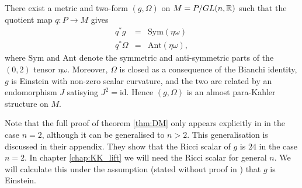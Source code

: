 \begin{theo}{\cite{DM}}\label{thm:DM}
There exist a metric and two-form
$(g,\Omega)$ on $\mbox{\ensuremath{M=P/GL(n,\mathbb{R})}}$ such
that the quotient map $q:P\rightarrow M$ gives
\begin{eqnarray} 
q^{*}g & = & \mathrm{Sym}(\eta\omega) \label{eq:g_cartan} \\
q^{*}\Omega & = & \mathrm{Ant}(\eta\omega), \label{eq:Omega_cartan}
\end{eqnarray}
where $\mathrm{Sym}$ and $\mathrm{Ant}$ denote the symmetric and
anti-symmetric parts of the $(0,2)$ tensor $\eta\omega$. Moreover,
$\Omega$ is closed as a consequence of the Bianchi identity, $g$
is Einstein with non-zero scalar curvature, and the two are related
by an endomorphism $J$ satisying $J^{2}=\mathrm{id}$. Hence $(g,\Omega)$
is an almost para-Kahler structure on $M$.
\end{theo}

Note that the full proof of theorem \ref{thm:DM} only appears explicitly in \cite{DM} in the case $n=2$, although it can be generalised to $n>2$. This generalisation is discussed in their appendix. They show that the Ricci scalar of $g$ is $24$ in the case $n=2$. In chapter \ref{chap:KK_lift} we will need the Ricci scalar for general $n$. We will calculate this under the assumption (stated without proof in \cite{DM}) that $g$ is Einstein.



